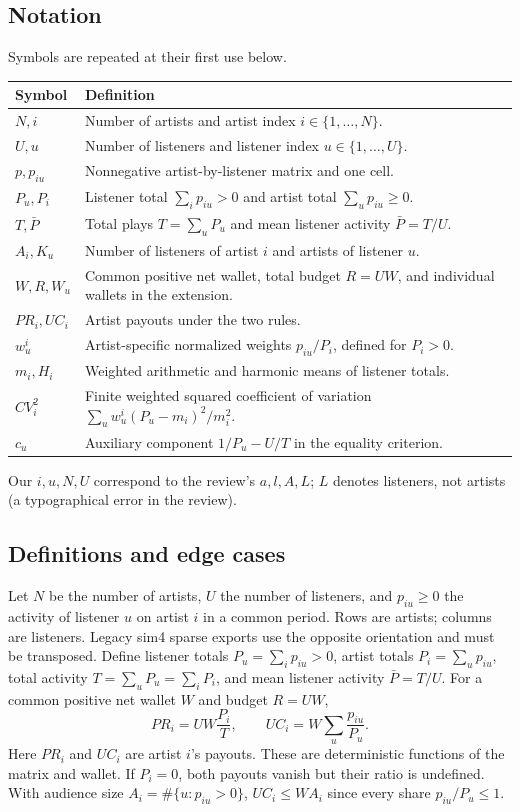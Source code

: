 \documentclass[11pt]{article}
\newcommand{\Pbar}{\bar P}
\begin{document}
\subsection{Notation}
Symbols are repeated at their first use below.
\begin{longtable}{p{2.6cm}p{11.8cm}}
\toprule Symbol & Definition \\
\midrule
$N,i$ & Number of artists and artist index $i\in\{1,\ldots,N\}$.\\
$U,u$ & Number of listeners and listener index $u\in\{1,\ldots,U\}$.\\
$p,p_{iu}$ & Nonnegative artist-by-listener matrix and one cell.\\
$P_u,P_i$ & Listener total $\sum_i p_{iu}>0$ and artist total $\sum_u p_{iu}\ge0$.\\
$T,\Pbar$ & Total plays $T=\sum_u P_u$ and mean listener activity $\Pbar=T/U$.\\
$A_i,K_u$ & Number of listeners of artist $i$ and artists of listener $u$.\\
$W,R,W_u$ & Common positive net wallet, total budget $R=UW$, and individual wallets in the extension.\\
$PR_i,UC_i$ & Artist payouts under the two rules.\\
$w^i_u$ & Artist-specific normalized weights $p_{iu}/P_i$, defined for $P_i>0$.\\
$m_i,H_i$ & Weighted arithmetic and harmonic means of listener totals.\\
$CV_i^2$ & Finite weighted squared coefficient of variation $\sum_u w^i_u(P_u-m_i)^2/m_i^2$.\\
$c_u$ & Auxiliary component $1/P_u-U/T$ in the equality criterion.\\
\bottomrule
\end{longtable}
Our $i,u,N,U$ correspond to the review's $a,l,A,L$; $L$ denotes listeners,
not artists (a typographical error in the review).

\subsection{Definitions and edge cases}
Let $N$ be the number of artists, $U$ the number of listeners, and
$p_{iu}\ge0$ the activity of listener $u$ on artist $i$ in a common period.
Rows are artists; columns are listeners. Legacy sim4 sparse exports use
the opposite orientation and must be transposed.
Define listener totals $P_u=\sum_i p_{iu}>0$, artist totals
$P_i=\sum_u p_{iu}$, total activity $T=\sum_uP_u=\sum_iP_i$, and mean
listener activity $\Pbar=T/U$. For a common positive net wallet $W$ and
budget $R=UW$,
\[
PR_i=UW\frac{P_i}{T},\qquad UC_i=W\sum_u\frac{p_{iu}}{P_u}.
\]
Here $PR_i$ and $UC_i$ are artist $i$'s payouts. These are deterministic
functions of the matrix and wallet. If $P_i=0$, both payouts vanish but
their ratio is undefined. With audience size $A_i=\#\{u:p_{iu}>0\}$,
$UC_i\le WA_i$ since every share $p_{iu}/P_u\le1$.
\end{document}
